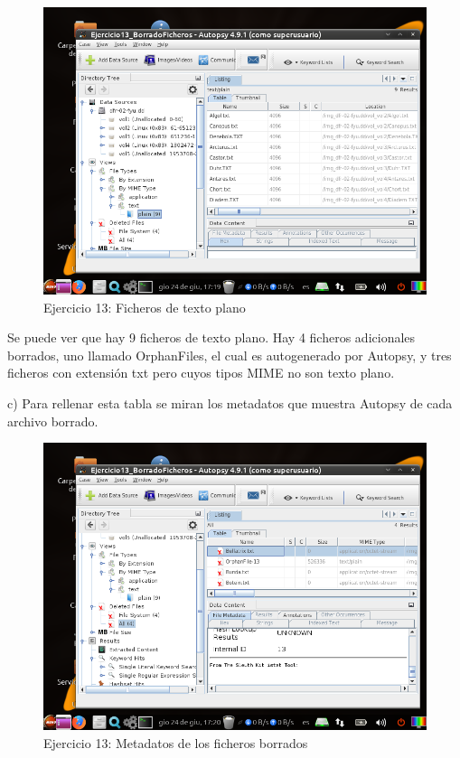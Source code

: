 \documentclass[11pt]{article}
\begin{document}
\begin{figure}[H]
    \caption{Ejercicio 13: Ficheros de texto plano}
    \centering
    \includegraphics[scale=0.7]{p03/e13-6.png}
\end{figure}

Se puede ver que hay 9 ficheros de texto plano. Hay 4 ficheros adicionales borrados, uno llamado OrphanFiles, el cual es autogenerado por Autopsy, y tres ficheros con extensión txt pero cuyos tipos MIME no son texto plano.

c) Para rellenar esta tabla se miran los metadatos que muestra Autopsy de cada archivo borrado.

\begin{figure}[H]
    \caption{Ejercicio 13: Metadatos de los ficheros borrados}
    \centering
    \includegraphics[scale=0.7]{p03/e13-7.png}
\end{figure}
\end{document}

